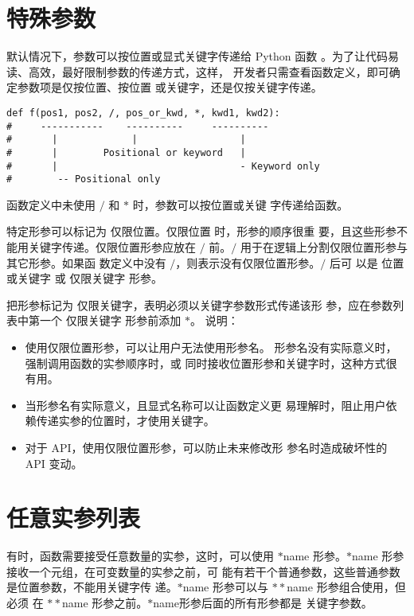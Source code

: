 \documentclass[a4paper, 12pt]{article}
\begin{document}
\section{特殊参数}
默认情况下，参数可以按位置或显式关键字传递给 Python 函数
。为了让代码易读、高效，最好限制参数的传递方式，这样，
开发者只需查看函数定义，即可确定参数项是仅按位置、按位置
或关键字，还是仅按关键字传递。\par
\begin{listing}[h!]
\begin{verbatim}
def f(pos1, pos2, /, pos_or_kwd, *, kwd1, kwd2):
#     -----------    ----------     ----------
#       |             |                  |
#       |        Positional or keyword   |
#       |                                - Keyword only
#        -- Positional only
\end{verbatim}
\end{listing}
函数定义中未使用 $\slash$ 和 $\ast$ 时，参数可以按位置或关键
字传递给函数。\par
特定形参可以标记为 仅限位置。仅限位置 时，形参的顺序很重
要，且这些形参不能用关键字传递。仅限位置形参应放在 $\slash$
前。$\slash$ 用于在逻辑上分割仅限位置形参与其它形参。如果函
数定义中没有 $\slash$，则表示没有仅限位置形参。$\slash$ 后可
以是 位置或关键字 或 仅限关键字 形参。\par
把形参标记为 仅限关键字，表明必须以关键字参数形式传递该形
参，应在参数列表中第一个 仅限关键字 形参前添加 $\ast$。
说明：\par
\begin{itemize}
    \item 使用仅限位置形参，可以让用户无法使用形参名。
    形参名没有实际意义时，强制调用函数的实参顺序时，或
    同时接收位置形参和关键字时，这种方式很有用。
    \item 当形参名有实际意义，且显式名称可以让函数定义更
    易理解时，阻止用户依赖传递实参的位置时，才使用关键字。
    \item 对于 API，使用仅限位置形参，可以防止未来修改形
    参名时造成破坏性的 API 变动。
\end{itemize}

\section{任意实参列表}
有时，函数需要接受任意数量的实参，这时，可以使用 $\ast$name
形参。$\ast$name 形参接收一个元组，在可变数量的实参之前，可
能有若干个普通参数，这些普通参数是位置参数，不能用关键字传
递。$\ast$name 形参可以与 $\ast\ast$name 形参组合使用，但必须
在 $\ast\ast$name 形参之前。$\ast$name形参后面的所有形参都是
关键字参数。\par
\end{document}
